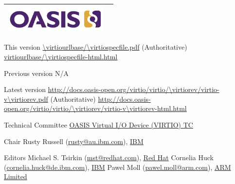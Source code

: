 \begin{titlepage}
\thispagestyle{fancy}

\begin{tabular*}{\textwidth}{@{\extracolsep{\fill}}lr}
	\includegraphics[height=0.55in]{images/oasis.png}\\
	\hline
\end{tabular*}

\oasistitle{\virtioversion}
\oasisstagelabel{\virtiodraftstagename}
\vspace{0.05in}\vfill
\oasisstagelabel{\virtioworkingdraftdate}

\vfill


\begin{oasistitlesection}{This version}
\url{\virtiourlbase/\virtiospecfile.pdf} (Authoritative)\newline
\url{virtiourlbase/\virtiospecfile-html.html}
\end{oasistitlesection}

\begin{oasistitlesection}{Previous version}
N/A
\end{oasistitlesection}

\begin{oasistitlesection}{Latest version}
\url{http://docs.oasis-open.org/virtio/virtio/\virtiorev/virtio-v\virtiorev.pdf} (Authoritative)\newline
\url{http://docs.oasis-open.org/virtio/virtio/\virtiorev/virtio-v\virtiorev-html.html}
\end{oasistitlesection}

\begin{oasistitlesection}{Technical Committee}
\href{https://www.oasis-open.org/committees/virtio/}{OASIS Virtual I/O Device (VIRTIO) TC}
\end{oasistitlesection}

\begin{oasistitlesection}{Chair}
Rusty Russell (\href{mailto:rusty@au.ibm.com}{rusty@au.ibm.com}), \href{http://www.ibm.com/}{IBM}\newline
\end{oasistitlesection}

\begin{oasistitlesection}{Editors}
Michael S. Tsirkin (\href{mailto:mst@redhat.com}{mst@redhat.com}), \href{http://redhat.com/}{Red Hat}\newline
Cornelia Huck (\href{mailto:cornelia.huck@de.ibm.com}{cornelia.huck@de.ibm.com}), \href{http://www.ibm.com/}{IBM}\newline
Pawel Moll (\href{mailto:pawel.moll@arm.com}{pawel.moll@arm.com}), \href{https://arm.com/}{ARM Limited}
\end{oasistitlesection}



\end{titlepage}
